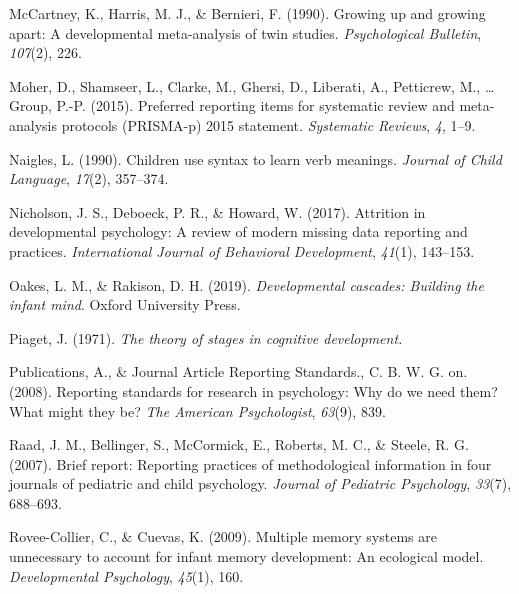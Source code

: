 \documentclass[
  man]{apa6}
\newlength{\cslhangindent}
\newlength{\cslentryspacingunit} %
\newenvironment{CSLReferences}[2] %
 {%
  \setlength{\parindent}{0pt}
  \ifodd #1
  \let\oldpar\par
  \def\par{\hangindent=\cslhangindent\oldpar}
  \fi
  \setlength{\parskip}{#2\cslentryspacingunit}
 }%
 {}
\begin{document}
\begin{CSLReferences}{1}{0}
\leavevmode{}%
McCartney, K., Harris, M. J., \& Bernieri, F. (1990). Growing up and growing apart: A developmental meta-analysis of twin studies. \emph{Psychological Bulletin}, \emph{107}(2), 226.

\leavevmode{}%
Moher, D., Shamseer, L., Clarke, M., Ghersi, D., Liberati, A., Petticrew, M., \ldots{} Group, P.-P. (2015). Preferred reporting items for systematic review and meta-analysis protocols (PRISMA-p) 2015 statement. \emph{Systematic Reviews}, \emph{4}, 1--9.

\leavevmode{}%
Naigles, L. (1990). Children use syntax to learn verb meanings. \emph{Journal of Child Language}, \emph{17}(2), 357--374.

\leavevmode{}%
Nicholson, J. S., Deboeck, P. R., \& Howard, W. (2017). Attrition in developmental psychology: A review of modern missing data reporting and practices. \emph{International Journal of Behavioral Development}, \emph{41}(1), 143--153.

\leavevmode{}%
Oakes, L. M., \& Rakison, D. H. (2019). \emph{Developmental cascades: Building the infant mind}. Oxford University Press.

\leavevmode{}%
Piaget, J. (1971). \emph{The theory of stages in cognitive development.}

\leavevmode{}%
Publications, A., \& Journal Article Reporting Standards., C. B. W. G. on. (2008). Reporting standards for research in psychology: Why do we need them? What might they be? \emph{The American Psychologist}, \emph{63}(9), 839.

\leavevmode{}%
Raad, J. M., Bellinger, S., McCormick, E., Roberts, M. C., \& Steele, R. G. (2007). Brief report: Reporting practices of methodological information in four journals of pediatric and child psychology. \emph{Journal of Pediatric Psychology}, \emph{33}(7), 688--693.

\leavevmode{}%
Rovee-Collier, C., \& Cuevas, K. (2009). Multiple memory systems are unnecessary to account for infant memory development: An ecological model. \emph{Developmental Psychology}, \emph{45}(1), 160.


\end{CSLReferences}
\end{document}
